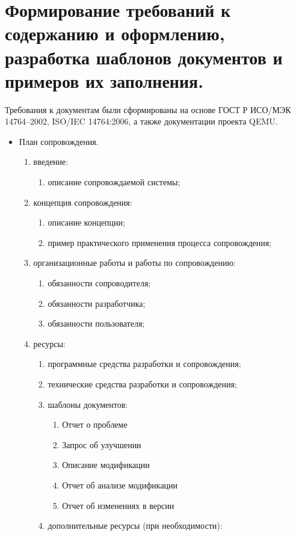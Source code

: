 
\pagebreak


\section{Формирование требований к содержанию и оформлению, разработка шаблонов документов и примеров их заполнения.}

Требования к документам были сформированы на основе ГОСТ Р ИСО/МЭК 14764--2002\cite{gost14764}, ISO/IEC 14764:2006\cite{iso14764}, а также документации проекта QEMU\cite{qemu,qemucontribute}.

\begin{itemize}
    \item План сопровождения.
    \begin{enumerate}
        \item введение:
        \begin{enumerate}
            \item описание сопровождаемой системы;
        \end{enumerate}
        \item концепция сопровождения:
        \begin{enumerate}
            \item описание концепции;
            \item пример практического применения процесса сопровождения;
        \end{enumerate}

        \item организационные работы и работы по сопровождению:
        \begin{enumerate}
            \item обязанности сопроводителя;
            \item обязанности разработчика;
            \item обязанности пользователя;
        \end{enumerate}

        \item ресурсы:
        \begin{enumerate}
            \item программные средства разработки и сопровождения;
            \item технические средства разработки и сопровождения;
            \item шаблоны документов:
            \begin{enumerate}
                \item Отчет о проблеме
                \item Запрос об улучшении
                \item Описание модификации
                \item Отчет об анализе модификации
                \item Отчет об изменениях в версии
            \end{enumerate}
            \item дополнительные ресурсы (при необходимости):
        \end{enumerate}


\end{enumerate}
\end{itemize}
